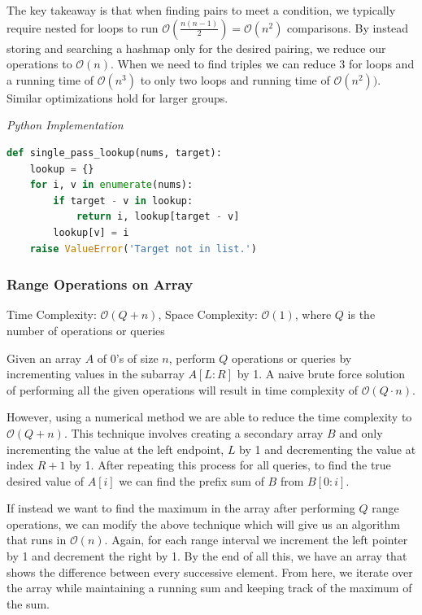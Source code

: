\documentclass{article}
\newcommand{\bigO}{\mathcal{O}}
\begin{document}
    The key takeaway is that when finding pairs to meet a condition, we typically require nested for loops to run $\bigO(\frac{n(n-1)}{2}) = \bigO(n^2)$ comparisons. By instead storing and searching a hashmap only for the desired pairing, we reduce our operations to $\bigO(n)$. When we need to find triples we can reduce 3 for loops and a running time of $\bigO(n^3)$ to only two loops and running time of $\bigO(n^2))$. Similar  optimizations hold for larger groups.


\vspace{8pt} \emph{Python Implementation}
\begin{lstlisting}[language=Python]
def single_pass_lookup(nums, target):
    lookup = {}
    for i, v in enumerate(nums):
        if target - v in lookup:
            return i, lookup[target - v]
        lookup[v] = i
    raise ValueError('Target not in list.')
\end{lstlisting}
    
    \subsubsection{Range Operations on Array}
    Time Complexity: $\bigO(Q + n)$, Space Complexity: $\bigO(1)$, where $Q$ is the number of operations or queries
    
    Given an array $A$ of 0's of size $n$, perform $Q$ operations or queries by incrementing values in the subarray $A[L: R]$ by 1. A naive brute force solution of performing all the given operations will result in time complexity of $\bigO(Q\cdot n)$. 
    
    However, using a numerical method we are able to reduce the time complexity to $\bigO(Q + n)$. This technique involves creating a secondary array $B$ and only incrementing the value at the left endpoint, $L$ by 1 and decrementing the value at index $R + 1$ by 1. After repeating this process for all queries, to find the true desired value of $A[i]$ we can find the prefix sum of $B$ from $B[0:i]$.
    
    If instead we want to find the maximum in the array after performing $Q$ range operations, we can modify the above technique which will give us an algorithm that runs in $\bigO(n)$. Again, for each range interval we increment the left pointer by 1 and decrement the right by 1. By the end of all this, we have an array that shows the difference between every successive element. From here, we iterate over the array while maintaining a running sum and keeping track of the maximum of the sum.
    
\end{document}
